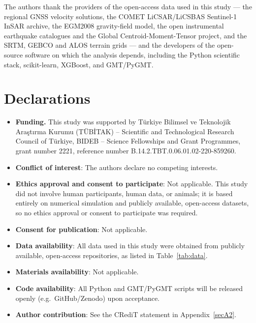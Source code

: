 \documentclass[pdflatex,sn-mathphys-num]{sn-jnl}%
\theoremstyle{thmstyleone}%
\theoremstyle{thmstyletwo}%
\theoremstyle{thmstylethree}%
\begin{document}
The authors thank the providers of the open-access data used in this study --- the
regional GNSS velocity solutions, the COMET LiCSAR/LiCSBAS Sentinel-1 InSAR archive,
the EGM2008 gravity-field model, the open instrumental earthquake catalogues and the
Global Centroid-Moment-Tensor project, and the SRTM, GEBCO and ALOS terrain grids ---
and the developers of the open-source software on which the analysis depends, including
the Python scientific stack, scikit-learn, XGBoost, and GMT/PyGMT.

\section*{Declarations}

\begin{itemize}
\item \textbf{Funding.} This study was supported by T\"{u}rkiye Bilimsel ve Teknolojik Ara\c{s}t\i{}rma Kurumu (T\"{U}B\.ITAK) -- Scientific and Technological Research Council of T\"{u}rkiye, BIDEB -- Science Fellowships and Grant Programmes, grant number 2221, reference number B.14.2.TBT.0.06.01.02-220-859260.
\item \textbf{Conflict of interest}: The authors declare no competing interests.
\item \textbf{Ethics approval and consent to participate}: Not applicable. This study did not involve human participants, human data, or animals; it is based entirely on numerical simulation and publicly available, open-access datasets, so no ethics approval or consent to participate was required.
\item \textbf{Consent for publication}: Not applicable.
\item \textbf{Data availability}: All data used in this study were obtained from publicly available, open-access repositories, as listed in Table~\ref{tab:data}.
\item \textbf{Materials availability}: Not applicable.
\item \textbf{Code availability}: All Python and GMT/PyGMT scripts will be released openly (e.g.\ GitHub/Zenodo) upon acceptance.
\item \textbf{Author contribution}: See the CRediT statement in Appendix~\ref{secA2}.
\end{itemize}
\end{document}
